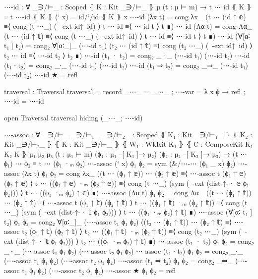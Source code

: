 \begin{code}
⋯-id :
  ∀ {_∋/⊢_ : Scoped} ⦃ K : Kit _∋/⊢_ ⦄ {µ} (t : µ ⊢ m)
  → t ⋯ id ⦃ K ⦄ ≡ t
⋯-id ⦃ K ⦄ (` x)     = id/`/id ⦃ K ⦄ x
⋯-id (λx t)          = cong λx_ (t ⋯ (id ↑ 𝕖) ≡⟨ cong (t ⋯_) (~-ext id↑~id) ⟩
                                 t ⋯ id       ≡⟨ ⋯-id t ⟩
                                 t            ∎)
⋯-id (Λα t)          = cong Λα_ (t ⋯ (id ↑ 𝕥) ≡⟨ cong (t ⋯_) (~-ext id↑~id) ⟩
                                 t ⋯ id       ≡⟨ ⋯-id t ⟩
                                 t            ∎)
⋯-id (∀[α∶ t₁ ] t₂)  = cong₂ ∀[α∶_]_ (⋯-id t₁)
                                     (t₂ ⋯ (id ↑ 𝕥) ≡⟨ cong (t₂ ⋯_) (~-ext id↑~id) ⟩
                                      t₂ ⋯ id       ≡⟨ ⋯-id t₂ ⟩
                                      t₂            ∎)
⋯-id (t₁ · t₂)       = cong₂ _·_ (⋯-id t₁) (⋯-id t₂)
⋯-id (t₁ ∙ t₂)       = cong₂ _∙_ (⋯-id t₁) (⋯-id t₂)
⋯-id (t₁ ⇒ t₂)       = cong₂ _⇒_ (⋯-id t₁) (⋯-id t₂)
⋯-id ★               = refl

traversal : Traversal
traversal = record
  { _⋯_   = _⋯_
  ; ⋯-var = λ x ϕ → refl
  ; ⋯-id  = ⋯-id
  }

open Traversal traversal hiding (_⋯_; ⋯-id)

⋯-assoc :
  ∀ {_∋/⊢_ _∋/⊢₁_ _∋/⊢₂_ : Scoped}
    ⦃ K₁ : Kit _∋/⊢₁_ ⦄ ⦃ K₂ : Kit _∋/⊢₂_ ⦄ ⦃ K : Kit _∋/⊢_ ⦄
    ⦃ W₁ : WkKit K₁ ⦄ ⦃ C : ComposeKit K₁ K₂ K ⦄
    {µ₁ µ₂ µ₃}
    (t : µ₁ ⊢ m) (ϕ₁ : µ₁ –[ K₁ ]→ µ₂) (ϕ₂ : µ₂ –[ K₂ ]→ µ₃)
  → (t ⋯ ϕ₁) ⋯ ϕ₂ ≡ t ⋯ (ϕ₁ ·ₘ ϕ₂)
⋯-assoc (` x)          ϕ₁ ϕ₂ = sym (&/⋯-⋯ (ϕ₁ _ x) ϕ₂)
⋯-assoc (λx t)         ϕ₁ ϕ₂ = cong λx_ ((t ⋯ (ϕ₁ ↑ 𝕖)) ⋯ (ϕ₂ ↑ 𝕖)  ≡⟨ ⋯-assoc t (ϕ₁ ↑ 𝕖) (ϕ₂ ↑ 𝕖) ⟩
                                         t ⋯ ((ϕ₁ ↑ 𝕖) ·ₘ (ϕ₂ ↑ 𝕖)) ≡⟨ cong (t ⋯_) (sym (~-ext (dist-↑-· 𝕖 ϕ₁ ϕ₂))) ⟩
                                         t ⋯ ((ϕ₁ ·ₘ ϕ₂) ↑ 𝕖)       ∎)
⋯-assoc (Λα t)         ϕ₁ ϕ₂ = cong Λα_ ((t ⋯ (ϕ₁ ↑ 𝕥)) ⋯ (ϕ₂ ↑ 𝕥)  ≡⟨ ⋯-assoc t (ϕ₁ ↑ 𝕥) (ϕ₂ ↑ 𝕥) ⟩
                                         t ⋯ ((ϕ₁ ↑ 𝕥) ·ₘ (ϕ₂ ↑ 𝕥)) ≡⟨ cong (t ⋯_) (sym (~-ext (dist-↑-· 𝕥 ϕ₁ ϕ₂))) ⟩
                                         t ⋯ ((ϕ₁ ·ₘ ϕ₂) ↑ 𝕥)       ∎)
⋯-assoc (∀[α∶ t₁ ] t₂) ϕ₁ ϕ₂ = cong₂ ∀[α∶_]_ (⋯-assoc t₁ ϕ₁ ϕ₂)
                                        ((t₂ ⋯ (ϕ₁ ↑ 𝕥)) ⋯ (ϕ₂ ↑ 𝕥)  ≡⟨ ⋯-assoc t₂ (ϕ₁ ↑ 𝕥) (ϕ₂ ↑ 𝕥) ⟩
                                         t₂ ⋯ ((ϕ₁ ↑ 𝕥) ·ₘ (ϕ₂ ↑ 𝕥)) ≡⟨ cong (t₂ ⋯_) (sym (~-ext (dist-↑-· 𝕥 ϕ₁ ϕ₂))) ⟩
                                         t₂ ⋯ ((ϕ₁ ·ₘ ϕ₂) ↑ 𝕥)       ∎)
⋯-assoc (t₁ · t₂)      ϕ₁ ϕ₂ = cong₂ _·_ (⋯-assoc t₁ ϕ₁ ϕ₂) (⋯-assoc t₂ ϕ₁ ϕ₂)
⋯-assoc (t₁ ∙ t₂)      ϕ₁ ϕ₂ = cong₂ _∙_ (⋯-assoc t₁ ϕ₁ ϕ₂) (⋯-assoc t₂ ϕ₁ ϕ₂)
⋯-assoc (t₁ ⇒ t₂)      ϕ₁ ϕ₂ = cong₂ _⇒_ (⋯-assoc t₁ ϕ₁ ϕ₂) (⋯-assoc t₂ ϕ₁ ϕ₂)
⋯-assoc ★              ϕ₁ ϕ₂ = refl


\end{code}
